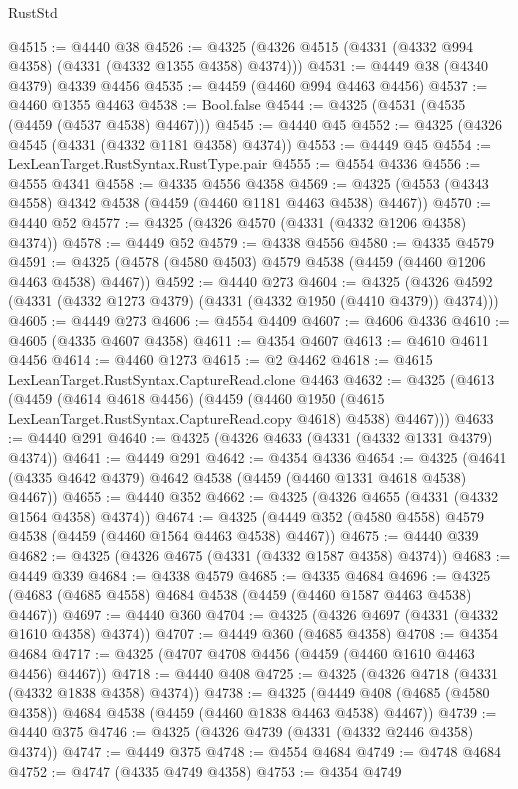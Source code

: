 \begin{lexlean}{RustStd}
\begin{coremodule}
@4515 := @4440 @38
@4526 := @4325 (@4326 @4515 (@4331 (@4332 @994 @4358) (@4331 (@4332 @1355 @4358) @4374)))
@4531 := @4449 @38 (@4340 @4379) @4339 @4456
@4535 := @4459 (@4460 @994 @4463 @4456)
@4537 := @4460 @1355 @4463
@4538 := Bool.false
@4544 := @4325 (@4531 (@4535 (@4459 (@4537 @4538) @4467)))
@4545 := @4440 @45
@4552 := @4325 (@4326 @4545 (@4331 (@4332 @1181 @4358) @4374))
@4553 := @4449 @45
@4554 := LexLeanTarget.RustSyntax.RustType.pair
@4555 := @4554 @4336
@4556 := @4555 @4341
@4558 := @4335 @4556 @4358
@4569 := @4325 (@4553 (@4343 @4558) @4342 @4538 (@4459 (@4460 @1181 @4463 @4538) @4467))
@4570 := @4440 @52
@4577 := @4325 (@4326 @4570 (@4331 (@4332 @1206 @4358) @4374))
@4578 := @4449 @52
@4579 := @4338 @4556
@4580 := @4335 @4579
@4591 := @4325 (@4578 (@4580 @4503) @4579 @4538 (@4459 (@4460 @1206 @4463 @4538) @4467))
@4592 := @4440 @273
@4604 := @4325 (@4326 @4592 (@4331 (@4332 @1273 @4379) (@4331 (@4332 @1950 (@4410 @4379)) @4374)))
@4605 := @4449 @273
@4606 := @4554 @4409
@4607 := @4606 @4336
@4610 := @4605 (@4335 @4607 @4358)
@4611 := @4354 @4607
@4613 := @4610 @4611 @4456
@4614 := @4460 @1273
@4615 := @2 @4462
@4618 := @4615 LexLeanTarget.RustSyntax.CaptureRead.clone @4463
@4632 := @4325
    (@4613
      (@4459
        (@4614 @4618 @4456)
        (@4459 (@4460 @1950 (@4615 LexLeanTarget.RustSyntax.CaptureRead.copy @4618) @4538) @4467)))
@4633 := @4440 @291
@4640 := @4325 (@4326 @4633 (@4331 (@4332 @1331 @4379) @4374))
@4641 := @4449 @291
@4642 := @4354 @4336
@4654 := @4325 (@4641 (@4335 @4642 @4379) @4642 @4538 (@4459 (@4460 @1331 @4618 @4538) @4467))
@4655 := @4440 @352
@4662 := @4325 (@4326 @4655 (@4331 (@4332 @1564 @4358) @4374))
@4674 := @4325 (@4449 @352 (@4580 @4558) @4579 @4538 (@4459 (@4460 @1564 @4463 @4538) @4467))
@4675 := @4440 @339
@4682 := @4325 (@4326 @4675 (@4331 (@4332 @1587 @4358) @4374))
@4683 := @4449 @339
@4684 := @4338 @4579
@4685 := @4335 @4684
@4696 := @4325 (@4683 (@4685 @4558) @4684 @4538 (@4459 (@4460 @1587 @4463 @4538) @4467))
@4697 := @4440 @360
@4704 := @4325 (@4326 @4697 (@4331 (@4332 @1610 @4358) @4374))
@4707 := @4449 @360 (@4685 @4358)
@4708 := @4354 @4684
@4717 := @4325 (@4707 @4708 @4456 (@4459 (@4460 @1610 @4463 @4456) @4467))
@4718 := @4440 @408
@4725 := @4325 (@4326 @4718 (@4331 (@4332 @1838 @4358) @4374))
@4738 := @4325
    (@4449 @408 (@4685 (@4580 @4358)) @4684 @4538 (@4459 (@4460 @1838 @4463 @4538) @4467))
@4739 := @4440 @375
@4746 := @4325 (@4326 @4739 (@4331 (@4332 @2446 @4358) @4374))
@4747 := @4449 @375
@4748 := @4554 @4684
@4749 := @4748 @4684
@4752 := @4747 (@4335 @4749 @4358)
@4753 := @4354 @4749

\end{coremodule}
\end{lexlean}
